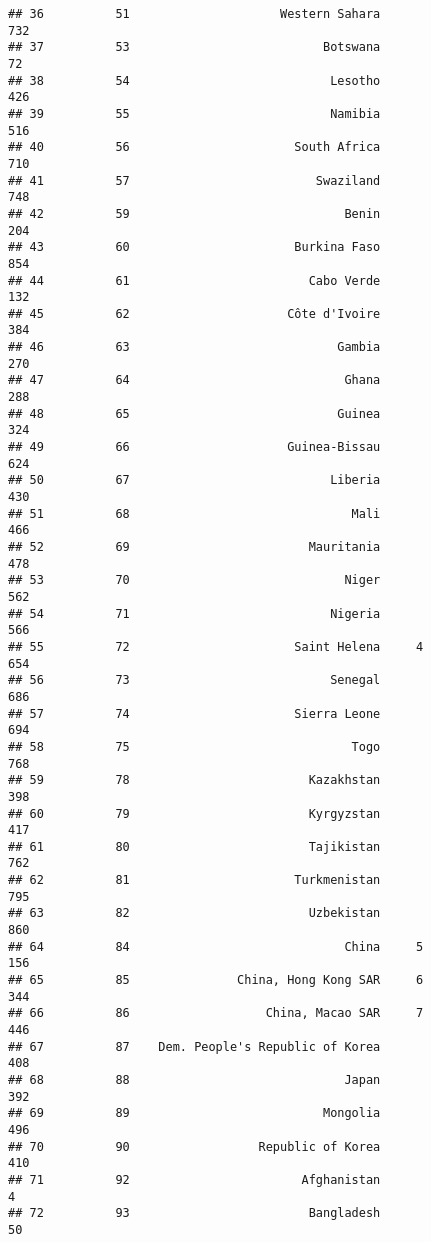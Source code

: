 \documentclass[]{article}
\begin{document}
\begin{verbatim}
## 36          51                     Western Sahara                732
## 37          53                           Botswana                 72
## 38          54                            Lesotho                426
## 39          55                            Namibia                516
## 40          56                       South Africa                710
## 41          57                          Swaziland                748
## 42          59                              Benin                204
## 43          60                       Burkina Faso                854
## 44          61                         Cabo Verde                132
## 45          62                      Côte d'Ivoire                384
## 46          63                             Gambia                270
## 47          64                              Ghana                288
## 48          65                             Guinea                324
## 49          66                      Guinea-Bissau                624
## 50          67                            Liberia                430
## 51          68                               Mali                466
## 52          69                         Mauritania                478
## 53          70                              Niger                562
## 54          71                            Nigeria                566
## 55          72                       Saint Helena     4          654
## 56          73                            Senegal                686
## 57          74                       Sierra Leone                694
## 58          75                               Togo                768
## 59          78                         Kazakhstan                398
## 60          79                         Kyrgyzstan                417
## 61          80                         Tajikistan                762
## 62          81                       Turkmenistan                795
## 63          82                         Uzbekistan                860
## 64          84                              China     5          156
## 65          85               China, Hong Kong SAR     6          344
## 66          86                   China, Macao SAR     7          446
## 67          87    Dem. People's Republic of Korea                408
## 68          88                              Japan                392
## 69          89                           Mongolia                496
## 70          90                  Republic of Korea                410
## 71          92                        Afghanistan                  4
## 72          93                         Bangladesh                 50

\end{verbatim}
\end{document}
